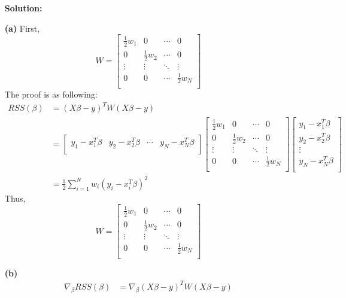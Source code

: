 \documentclass[10pt]{article}
\begin{document}
\begin{enumerate}[1.]
\begin{itemize}
	      \end{itemize}
	\textbf{Solution:}
		\item[\textbf{(a)}] First, 
		$$W = \begin{bmatrix}
			\frac{1}{2}w_1 &0  & \cdots   & 0  \\
			0 & \frac{1}{2}w_2  & \cdots   & 0  \\
			\vdots & \vdots  & \ddots   & \vdots  \\
			0 & 0  & \cdots  & \frac{1}{2}w_N \\
			\end{bmatrix}
		$$
		The proof is as following:
		$$
		\begin{aligned}
			RSS(\beta) &= (X\beta-y)^T W (X\beta-y)
			\\&=
			\begin{bmatrix}
				y_1-x_1^T\beta &y_2-x_2^T\beta  & \cdots   & y_N-x_N^T\beta \\
			\end{bmatrix} 
			\begin{bmatrix}
			\frac{1}{2}w_1 &0  & \cdots   & 0  \\
			0 & \frac{1}{2}w_2  & \cdots   & 0  \\
			\vdots & \vdots  & \ddots   & \vdots  \\
			0 & 0  & \cdots  & \frac{1}{2}w_N \\
			\end{bmatrix} 
			\begin{bmatrix}
				y_1-x_1^T\beta   \\
				y_2-x_2^T\beta   \\
				\vdots 		     \\
				y_N-x_N^T\beta   \\
			\end{bmatrix}
			\\&=\frac{1}{2}\sum_{i=1}^{N}w_{i}(y_{i} -x_{i}^{T}\beta)^{2}
		\end{aligned}
		$$
		Thus, 
		$$
		W = \begin{bmatrix}
			\frac{1}{2}w_1 &0  & \cdots   & 0  \\
			0 & \frac{1}{2}w_2  & \cdots   & 0  \\
			\vdots & \vdots  & \ddots   & \vdots  \\
			0 & 0  & \cdots  & \frac{1}{2}w_N \\
			\end{bmatrix}
		$$
		\item[\textbf{(b)}] 
		$$
		\begin{aligned}
			\nabla_{\beta} RSS(\beta) &=\nabla_{\beta} (X\beta-y)^T W (X\beta-y)

\end{aligned}$$
\end{enumerate}
\end{document}
